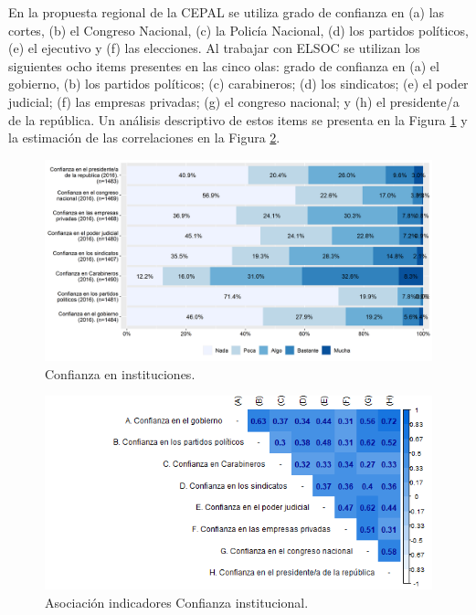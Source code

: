 \documentclass[
  12pt,
]{book}
\begin{document}
En la propuesta regional de la CEPAL se utiliza grado de confianza en (a) las cortes, (b) el Congreso Nacional, (c) la Policía Nacional, (d) los partidos políticos, (e) el ejecutivo y (f) las elecciones. Al trabajar con ELSOC se utilizan los siguientes ocho items presentes en las cinco olas: grado de confianza en (a) el gobierno, (b) los partidos políticos; (c) carabineros; (d) los sindicatos; (e) el poder judicial; (f) las empresas privadas; (g) el congreso nacional; y (h) el presidente/a de la república. Un análisis descriptivo de estos items se presenta en la Figura \ref{fig:confianza-institucional} y la estimación de las correlaciones en la Figura \ref{fig:confianza-institucional-cor}.

\begin{figure}[H]

{\centering \includegraphics[width=1\linewidth,height=1\textheight]{output/graphs/confianza-institucional} 

}

\caption{Confianza en instituciones.}\label{fig:confianza-institucional}
\end{figure}

\begin{figure}[H]

{\centering \includegraphics[width=1\linewidth,height=1\textheight]{output/graphs/confianza-institucional_cor} 

}

\caption{Asociación indicadores Confianza institucional.}\label{fig:confianza-institucional-cor}
\end{figure}
\end{document}
